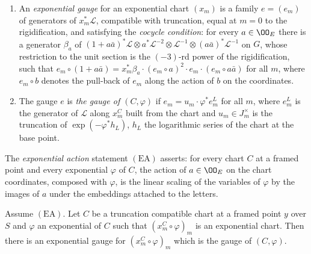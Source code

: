 \begin{definition}
\begin{enumerate}[label=(\alph*)]
\item An \emph{exponential gauge} for an exponential chart $(x_m)$ is a family $e=(e_m)$ of generators of $x_m^*\mathcal L$,
compatible with truncation, equal at $m=0$ to the rigidification, and satisfying the \emph{cocycle condition}: for every
$a\in\OO_E$ there is a generator $\beta_a$ of $(1+a\bar a)^*\mathcal L\otimes a^*\mathcal L^{-2}\otimes\mathcal L^{-1}
\otimes(a\bar a)^*\mathcal L^{-1}$ on $G$, whose restriction to the unit section is the $(-3)$-rd power of the
rigidification, such that $e_m\circ(1+a\bar a)=x_m^*\beta_a\cdot(e_m\circ a)^2\cdot e_m\cdot(e_m\circ a\bar a)$ for all $m$,
where $e_m\circ b$ denotes the pull-back of $e_m$ along the action of $b$ on the coordinates.
\item The gauge $e$ is \emph{the gauge of $(C,\varphi)$} if $e_m=u_m\cdot\varphi^*e^L_m$ for all $m$, where $e^L_m$ is the
generator of $\mathcal L$ along $x^C_m$ built from the chart and $u_m\in J_m^\times$ is the truncation of
$\exp(-\varphi^*h_L)$, $h_L$ the logarithmic series of the chart at the base point.
\end{enumerate}
The \emph{exponential action} statement $(\mathrm{EA})$ asserts: for every chart $C$ at a framed point and every exponential
$\varphi$ of $C$, the action of $a\in\OO_E$ on the chart coordinates, composed with $\varphi$, is the linear scaling of the
variables of $\varphi$ by the images of $a$ under the embeddings attached to the letters.
\end{definition}

\begin{theorem}\label{pf:sh-curv:expgauge}
Assume $(\mathrm{EA})$. Let $C$ be a truncation compatible chart at a framed point $y$ over $S$ and $\varphi$ an exponential
of $C$ such that $(x^C_m\circ\varphi)_m$ is an exponential chart. Then there is an exponential gauge for
$(x^C_m\circ\varphi)_m$ which is the gauge of $(C,\varphi)$.
\end{theorem}

